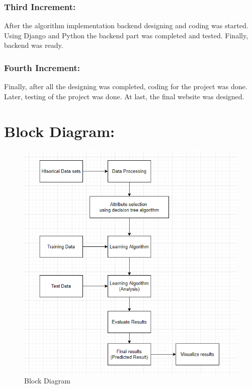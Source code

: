 \subsubsection{Third Increment:}
After the algorithm implementation backend designing and coding 
was started. Using Django and Python the backend part 
was completed and tested. Finally, backend was ready.

\subsubsection{Fourth Increment:}
Finally, after all the designing was completed, coding for the project was done. Later, 
testing of the project was done. 
At last, the final website was designed.

\section{Block Diagram:}
\begin{figure}[H]
	\centering
	\includegraphics[width=160mm]{images/blockdiagram.png}
	\caption{Block Diagram} %
	\label{figblockdiagram} %
\end{figure}

